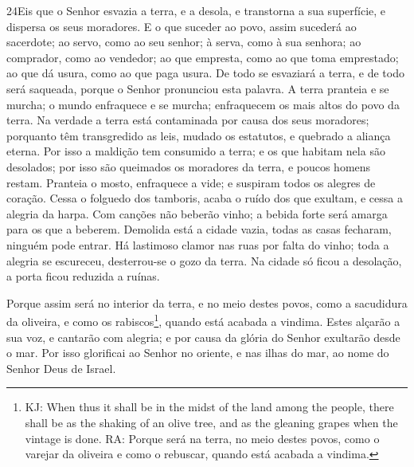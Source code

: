 \lettrine{24}{}Eis que o Senhor esvazia a terra, e a desola, e
transtorna a sua superfície, e dispersa os seus moradores. E o
que suceder ao povo, assim sucederá ao sacerdote; ao servo, como ao
seu senhor; à serva, como à sua senhora; ao comprador, como ao
vendedor; ao que empresta, como ao que toma emprestado; ao que dá
usura, como ao que paga usura. De todo se esvaziará a terra, e
de todo será saqueada, porque o Senhor pronunciou esta palavra.
A terra pranteia e se murcha; o mundo enfraquece e se murcha;
enfraquecem os mais altos do povo da terra. Na verdade a terra
está contaminada por causa dos seus moradores; porquanto têm
transgredido as leis, mudado os estatutos, e quebrado a aliança
eterna. Por isso a maldição tem consumido a terra; e os que
habitam nela são desolados; por isso são queimados os moradores da
terra, e poucos homens restam. Pranteia o mosto, enfraquece a
vide; e suspiram todos os alegres de coração. Cessa o folguedo
dos tamboris, acaba o ruído dos que exultam, e cessa a alegria da
harpa. Com canções não beberão vinho; a bebida forte será amarga
para os que a beberem. Demolida está a cidade vazia, todas as
casas fecharam, ninguém pode entrar. Há lastimoso clamor nas
ruas por falta do vinho; toda a alegria se escureceu, desterrou-se o
gozo da terra. Na cidade só ficou a desolação, a porta ficou
reduzida a ruínas.

Porque assim será no interior da terra, e no meio destes povos,
como a sacudidura da oliveira, e como os rabiscos\footnote{KJ: When
thus it shall be in the midst of the land among the people, there
shall be as the shaking of an olive tree, and as the gleaning grapes
when the vintage is done. RA: Porque será na terra, no meio destes
povos, como o varejar da oliveira e como o rebuscar, quando está
acabada a vindima.}, quando está acabada a vindima. Estes
alçarão a sua voz, e cantarão com alegria; e por causa da glória do
Senhor exultarão desde o mar. Por isso glorificai ao Senhor
no oriente, e nas ilhas do mar, ao nome do Senhor Deus de Israel.

